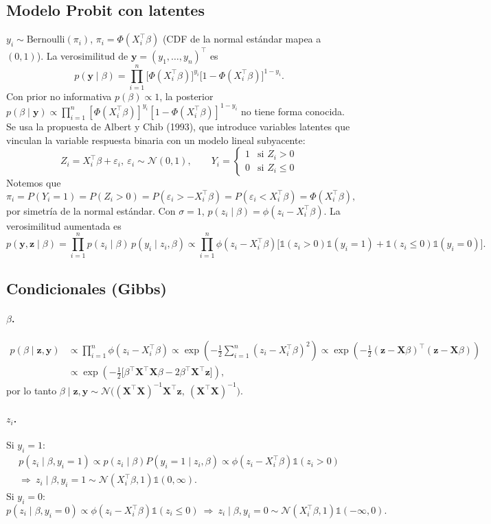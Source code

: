 \documentclass[11pt]{article}
\newcommand{\N}{\mathcal{N}}
\newcommand{\ind}{\mathbb{1}}
\newcommand{\bX}{\mathbf{X}}
\newcommand{\by}{\mathbf{y}}
\newcommand{\bz}{\mathbf{z}}
\theoremstyle{definition}
\begin{document}
\subsection{Modelo Probit con latentes}
$y_i\sim\text{Bernoulli}(\pi_i)$, $\pi_i=\Phi(X_i^{\top}\beta)$ (CDF de la normal estándar mapea a $(0,1)$). La verosimilitud de $\by=(y_1,\dots,y_n)^{\top}$ es
\[
p(\by\mid\beta)=\prod_{i=1}^n\big[\Phi(X_i^{\top}\beta)\big]^{y_i}\big[1-\Phi(X_i^{\top}\beta)\big]^{1-y_i}.
\]
Con prior no informativa $p(\beta)\propto 1$, la posterior $p(\beta\mid\by)\propto\prod_{i=1}^n[\Phi(X_i^{\top}\beta)]^{y_i}[1-\Phi(X_i^{\top}\beta)]^{1-y_i}$ no tiene forma conocida. Se usa la propuesta de Albert y Chib (1993), que introduce variables latentes que vinculan la variable respuesta binaria con un modelo lineal subyacente:
\[
Z_i=X_i^{\top}\beta+\varepsilon_i,\ \varepsilon_i\sim\N(0,1),\qquad Y_i=\begin{cases}1 & \text{si }Z_i>0\\ 0 & \text{si }Z_i\le0\end{cases}
\]
Notemos que
\[
\pi_i=P(Y_i=1)=P(Z_i>0)=P(\varepsilon_i>-X_i^{\top}\beta)=P(\varepsilon_i<X_i^{\top}\beta)=\Phi(X_i^{\top}\beta),
\]
por simetría de la normal estándar. Con $\sigma=1$, $p(z_i\mid\beta)=\phi(z_i-X_i^{\top}\beta)$. La verosimilitud aumentada es
\[
p(\by,\bz\mid\beta)=\prod_{i=1}^n p(z_i\mid\beta)\,p(y_i\mid z_i,\beta)
\propto\prod_{i=1}^n\phi(z_i-X_i^{\top}\beta)\big[\ind(z_i>0)\ind(y_i=1)+\ind(z_i\le0)\ind(y_i=0)\big].
\]

\subsection{Condicionales (Gibbs)}
\paragraph{$\beta$.}
\begin{align*}
p(\beta\mid\bz,\by)&\propto\prod_{i=1}^n\phi(z_i-X_i^{\top}\beta)
\propto\exp\!\left(-\tfrac12\sum_{i=1}^n(z_i-X_i^{\top}\beta)^2\right)
\propto\exp\!\left(-\tfrac12(\bz-\bX\beta)^{\top}(\bz-\bX\beta)\right)\\
&\propto\exp\!\left(-\tfrac12\big[\beta^{\top}\bX^{\top}\bX\beta-2\beta^{\top}\bX^{\top}\bz\big]\right),
\end{align*}
por lo tanto $\beta\mid\bz,\by\sim\N\big((\bX^{\top}\bX)^{-1}\bX^{\top}\bz,\ (\bX^{\top}\bX)^{-1}\big)$.

\paragraph{$z_i$.} Si $y_i=1$:
\begin{multline*}
p(z_i\mid\beta,y_i=1)\propto p(z_i\mid\beta)P(y_i=1\mid z_i,\beta)\propto\phi(z_i-X_i^{\top}\beta)\ind(z_i>0)\\
\Rightarrow\ z_i\mid\beta,y_i=1\sim\N(X_i^{\top}\beta,1)\ind(0,\infty).
\end{multline*}
Si $y_i=0$:
\[
p(z_i\mid\beta,y_i=0)\propto\phi(z_i-X_i^{\top}\beta)\ind(z_i\le0)\ \Rightarrow\ z_i\mid\beta,y_i=0\sim\N(X_i^{\top}\beta,1)\ind(-\infty,0).
\]
\end{document}
